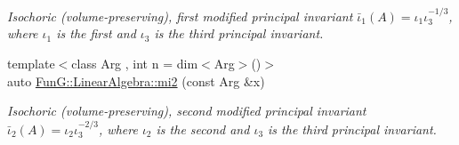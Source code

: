 \begin{DoxyCompactItemize}
\begin{DoxyCompactList}\small\item\em Isochoric (volume-\/preserving), first modified principal invariant $ \bar\iota_1(A)=\iota_1\iota_3^{-1/3} $, where $\iota_1$ is the first and $\iota_3$ is the third principal invariant. \end{DoxyCompactList}\item 
{\footnotesize template$<$class Arg , int n = dim$<$\-Arg$>$()$>$ }\\auto \hyperlink{group__InvariantGroup_ga9d219c5c48cce1d3af60345916963524}{Fun\-G\-::\-Linear\-Algebra\-::mi2} (const Arg \&x)
\begin{DoxyCompactList}\small\item\em Isochoric (volume-\/preserving), second modified principal invariant $ \bar\iota_2(A)=\iota_2\iota_3^{-2/3} $, where $\iota_2$ is the second and $\iota_3$ is the third principal invariant. \end{DoxyCompactList}\end{DoxyCompactItemize}
